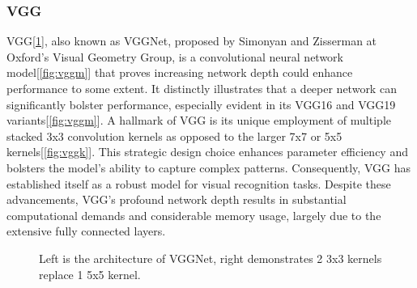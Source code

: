 \documentclass[10pt,twocolumn,letterpaper]{article}
\begin{document}
\subsubsection{VGG}
VGG[\ref{fig:vgg}], also known as VGGNet, proposed by Simonyan and Zisserman\cite{simonyan2014very} at Oxford's Visual Geometry Group, is a convolutional neural network model[\ref{fig:vggm}] that proves increasing network depth could enhance performance to some extent.  It distinctly illustrates that a deeper network can significantly bolster performance, especially evident in its VGG16 and VGG19 variants\cite{simonyan2014very}[\ref{fig:vggm}]. A hallmark of VGG is its unique employment of multiple stacked 3x3 convolution kernels as opposed to the larger 7x7 or 5x5 kernels[\ref{fig:vggk}]. This strategic design choice enhances parameter efficiency and bolsters the model's ability to capture complex patterns. Consequently, VGG has established itself as a robust model for visual recognition tasks. Despite these advancements, VGG’s profound network depth results in substantial computational demands and considerable memory usage, largely due to the extensive fully connected layers.
\begin{figure}[h]
	\centering
	\caption{Left is the architecture of VGGNet, right demonstrates 2 3x3 kernels replace 1 5x5 kernel\cite{simonyan2014very}.}
	\label{fig:vgg}
\end{figure}
\end{document}
